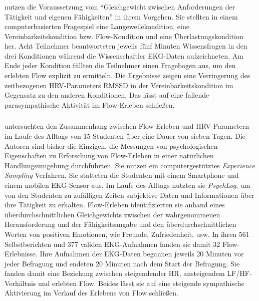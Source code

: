 \subsubsection{\citet{Keller2011}}
\citet{Keller2011} nutzen die Voraussetzung vom "`Gleichgewicht zwischen Anforderungen der Tätigkeit und eigenen Fähigkeiten"' in ihrem Vorgehen. Sie stellten in einem computerbasierten Fragespiel eine Langeweilekondition, eine Vereinbarkeitskondition bzw. Flow-Kondition und eine Überlastungskondition her. Acht Teilnehmer beantworteten jeweils fünf Minuten Wissensfragen in den drei Konditionen während die Wissenschaftler \ac{EKG}-Daten aufzeichneten. Am Ende jeder Kondition füllten die Teilnehmer einen Fragebogen \citep{Keller2008} aus, um den erlebten Flow explizit zu ermitteln. Die Ergebnisse zeigen eine Verringerung des zeitbezogenen \ac{HRV}-Parameters \acs{RMSSD} in der Vereinbarkeitskondition im Gegensatz zu den anderen Konditionen. Das lässt auf eine fallende parasympathische Aktivität im Flow-Erleben schließen.

\subsubsection{\citet{Gaggioli2013}}
\citet{Gaggioli2013} untersuchten den Zusammenhang zwischen Flow-Erleben und \ac{HRV}-Parametern im Laufe des Alltags von 15 Studenten über eine Dauer von sieben Tagen. Die Autoren sind bisher die Einzigen, die Messungen von psychologischen Eigenschaften zu Erforschung von Flow-Erleben in einer natürlichen Handlungsumgebung durchführten. Sie nutzen ein computergestütztes \emph{Experience Sampling} Verfahren. Sie statteten die Studenten mit einem Smartphone und einem mobilen \ac{EKG}-Sensor aus. Im Laufe des Alltags nutzten sie \emph{PsychLog}, um von den Studenten zu zufälligen Zeiten subjektive Daten und Informationen über ihre Tätigkeit zu erhalten. Flow-Erleben identifizierten sie anhand eines überdurchschnittlichen Gleichgewichts zwischen der wahrgenommenen Herausforderung und der Fähigkeitsangabe und den überdurchschnittlichen Werten von positiven Emotionen, wie Freunde, Zufriedenheit, usw. In ihren 561 Selbstberichten und 377 validen \ac{EKG}-Aufnahmen fanden sie damit 32 Flow-Erlebnisse. Ihre Aufnahmen der \ac{EKG}-Daten begannen jeweils 20 Minuten vor jeder Befragung und endeten 20 Minuten nach dem Start der Befragung. Sie fanden damit eine Beziehung zwischen steigendender \ac{HR}, ansteigendem LF/HF-Verhältnis und erlebten Flow. Beides lässt sie auf eine steigende sympathische Aktivierung im Verlauf des Erlebens von Flow schließen.

